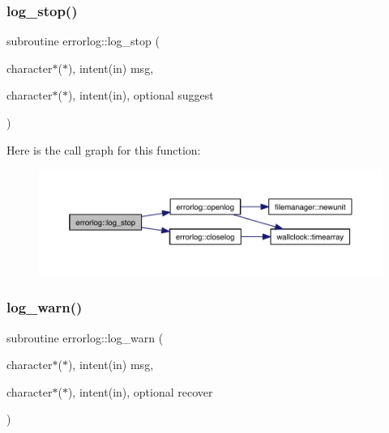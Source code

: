 \subsubsection{\texorpdfstring{log\+\_\+stop()}{log\_stop()}}
{\footnotesize\ttfamily subroutine errorlog\+::log\+\_\+stop (\begin{DoxyParamCaption}\item[{character$\ast$($\ast$), intent(in)}]{msg,  }\item[{character$\ast$($\ast$), intent(in), optional}]{suggest }\end{DoxyParamCaption})\hspace{0.3cm}{\ttfamily [private]}}

Here is the call graph for this function\+:\nopagebreak
\begin{figure}[H]
\begin{center}
\leavevmode
\includegraphics[width=350pt]{namespaceerrorlog_afe1872ea4ca114ccb25faaa2f2d60e2e_cgraph}
\end{center}
\end{figure}
\mbox{\label{namespaceerrorlog_ac0a3d2c2bcdb3af8e91b4a27d2ac5ac0}} 
\subsubsection{\texorpdfstring{log\+\_\+warn()}{log\_warn()}}
{\footnotesize\ttfamily subroutine errorlog\+::log\+\_\+warn (\begin{DoxyParamCaption}\item[{character$\ast$($\ast$), intent(in)}]{msg,  }\item[{character$\ast$($\ast$), intent(in), optional}]{recover }\end{DoxyParamCaption})\hspace{0.3cm}{\ttfamily [private]}}

